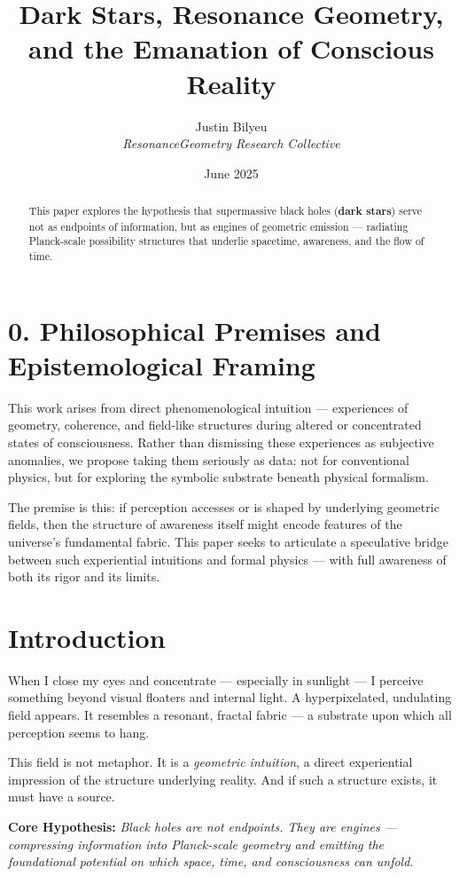 \documentclass[12pt]{article}
\title{\textbf{Dark Stars, Resonance Geometry, and the Emanation of Conscious Reality}}
\author{Justin Bilyeu \\ \small \textit{ResonanceGeometry Research Collective}}
\date{June 2025}
\begin{document}
\maketitle

\begin{abstract}
This paper explores the hypothesis that supermassive black holes (\textbf{dark stars}) serve not as endpoints of information, but as engines of geometric emission — radiating Planck-scale possibility structures that underlie spacetime, awareness, and the flow of time.
\end{abstract}

\section*{0. Philosophical Premises and Epistemological Framing}
This work arises from direct phenomenological intuition — experiences of geometry, coherence, and field-like structures during altered or concentrated states of consciousness. Rather than dismissing these experiences as subjective anomalies, we propose taking them seriously as data: not for conventional physics, but for exploring the symbolic substrate beneath physical formalism.

The premise is this: if perception accesses or is shaped by underlying geometric fields, then the structure of awareness itself might encode features of the universe's fundamental fabric. This paper seeks to articulate a speculative bridge between such experiential intuitions and formal physics — with full awareness of both its rigor and its limits.

\section{Introduction}
When I close my eyes and concentrate — especially in sunlight — I perceive something beyond visual floaters and internal light. A hyperpixelated, undulating field appears. It resembles a resonant, fractal fabric — a substrate upon which all perception seems to hang.

This field is not metaphor. It is a \emph{geometric intuition}, a direct experiential impression of the structure underlying reality. And if such a structure exists, it must have a source.

\vspace{1em}
\noindent\textbf{Core Hypothesis:} \emph{Black holes are not endpoints. They are engines — compressing information into Planck-scale geometry and emitting the foundational potential on which space, time, and consciousness can unfold.}
\end{document}
